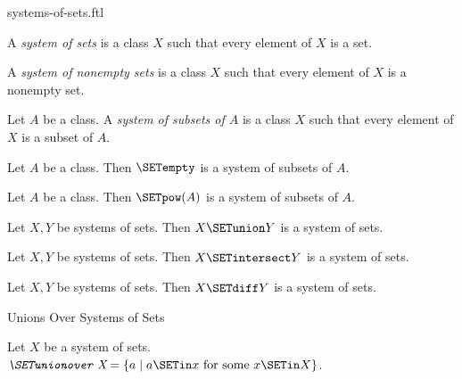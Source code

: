 \documentclass{stex}
\begin{document}
\begin{smodule}{systems-of-sets.ftl}

\begin{definition}[forthel,id=FOUNDATIONS_10_5805323570905088]
  A \emph{system of sets} is a class $X$ such that every element of $X$ is a set.
\end{definition}

\begin{definition}[forthel,id=FOUNDATIONS_10_1631952387964928]
  A \emph{system of nonempty sets} is a class $X$ such that every element of $X$ is a nonempty set.
\end{definition}

\begin{definition}[forthel,id=FOUNDATIONS_10_943381479948288]
  Let $A$ be a class.
  A \emph{system of subsets of $A$} is a class $X$ such that every element of $X$ is a subset of $A$.
\end{definition}

\begin{proposition}[forthel,id=FOUNDATIONS_10_8268633648136192]
  Let $A$ be a class.
  Then $\SETempty$ is a system of subsets of $A$.
\end{proposition}

\begin{proposition}[forthel,id=FOUNDATIONS_10_7546016869908480]
  Let $A$ be a class.
  Then $\SETpow(A)$ is a system of subsets of $A$.
\end{proposition}

\begin{proposition}[forthel,id=FOUNDATIONS_10_2794857209384572]
  Let $X, Y$ be systems of sets.
  Then $X \SETunion Y$ is a system of sets.
\end{proposition}

\begin{proposition}[forthel,id=FOUNDATIONS_10_1983754920483934]
  Let $X, Y$ be systems of sets.
  Then $X \SETintersect Y$ is a system of sets.
\end{proposition}

\begin{proposition}[forthel,id=FOUNDATIONS_10_0928495478392003]
  Let $X, Y$ be systems of sets.
  Then $X \SETdiff Y$ is a system of sets.
\end{proposition}

\begin{sfragment}{Unions Over Systems of Sets}
  \begin{definition}[forthel,id=FOUNDATIONS_10_541772562300928]
    Let $X$ be a system of sets.
    $\emph{\SETunionover X} = \{ a \mid a \SETin x\text{ for some }x \SETin X \}$.


\end{definition}
\end{sfragment}
\end{smodule}
\end{document}
